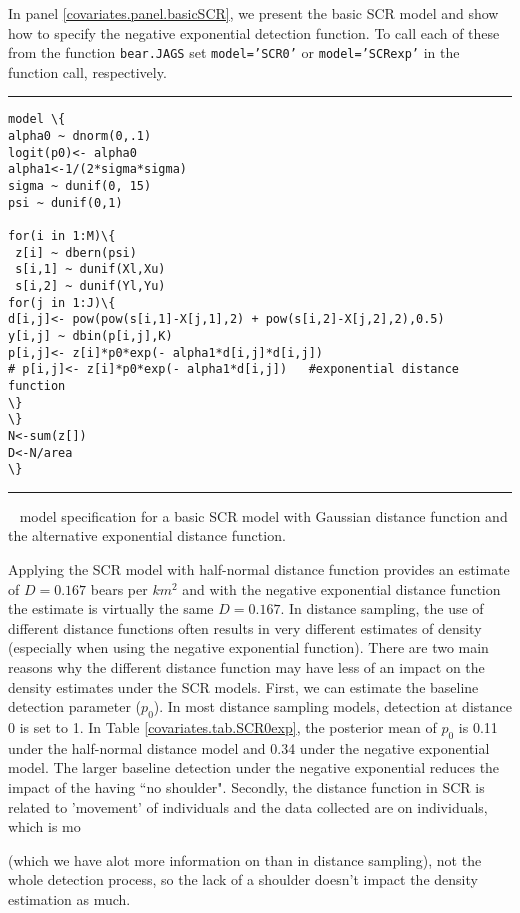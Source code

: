 In panel \ref{covariates.panel.basicSCR}, we present the basic SCR
model and show how to specify the negative exponential detection
function.  To call each of these from the function {\tt bear.JAGS} set
{\tt model='SCR0'} or {\tt model='SCRexp'} in the function call,
respectively.

\begin{panel}[htp]
\centering
\rule[0.1in]{\textwidth}{.03in}
{\small
\begin{Verbatim}[commandchars=\\\{\}]
model \{
alpha0 ~ dnorm(0,.1)
logit(p0)<- alpha0
alpha1<-1/(2*sigma*sigma)
sigma ~ dunif(0, 15)
psi ~ dunif(0,1)

for(i in 1:M)\{
 z[i] ~ dbern(psi)
 s[i,1] ~ dunif(Xl,Xu)
 s[i,2] ~ dunif(Yl,Yu)
for(j in 1:J)\{
d[i,j]<- pow(pow(s[i,1]-X[j,1],2) + pow(s[i,2]-X[j,2],2),0.5)
y[i,j] ~ dbin(p[i,j],K)
p[i,j]<- z[i]*p0*exp(- alpha1*d[i,j]*d[i,j])
# p[i,j]<- z[i]*p0*exp(- alpha1*d[i,j])   #exponential distance function
\}
\}
N<-sum(z[])
D<-N/area
\}

\end{Verbatim}
}

\rule[-0.1in]{\textwidth}{.03in}
\caption{
\jags~ model specification for a basic SCR model with Gaussian
distance 
function and the alternative exponential distance function.}
\label{covariates.panel.basicSCR}
\end{panel}

Applying the SCR model with  half-normal
distance function provides an estimate of $D = 0.167$ bears per $km^2$ and with the
negative exponential distance function the estimate is virtually the 
same $D = 0.167$.  In distance sampling, the use of different distance functions often 
results in very different estimates of density (especially when using the negative 
exponential function).  There are two main reasons why the different distance function may
have less of an impact on the density estimates under the SCR models.  First, we can estimate
the baseline detection parameter ($p_0$).  In most distance sampling models, detection 
at distance 0 is set to 1.  In Table  \ref{covariates.tab.SCR0exp}, the posterior mean of $p_0$ is 
0.11 under the half-normal distance model and 0.34 under the negative exponential model.  The larger
baseline detection under the negative exponential reduces the impact of the having ``no shoulder". 
Secondly, the distance function in SCR is related to 'movement' of individuals and the data collected
are on individuals, which is mo

(which we have alot more information on than in distance sampling), not the whole detection process, so the lack of a shoulder doesn't impact the density estimation as much.   

